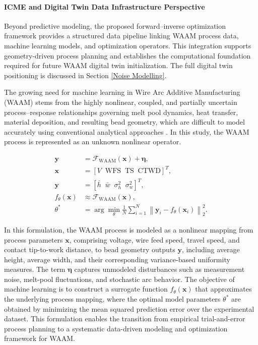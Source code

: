\documentclass[11pt]{article}
\begin{document}
\paragraph{ICME and Digital Twin Data Infrastructure Perspective}

Beyond predictive modeling, the proposed forward–inverse optimization framework provides a 
structured data pipeline linking WAAM process data, machine learning models, and optimization 
operators. This integration supports geometry-driven process planning and establishes the 
computational foundation required for future WAAM digital twin initialization. The full digital 
twin positioning is discussed in Section \ref{Noise Modelling}.

The growing need for machine learning in Wire Arc Additive Manufacturing (WAAM) stems from the highly nonlinear, coupled, and partially uncertain process--response relationships governing melt pool dynamics, heat transfer, material deposition, and resulting bead geometry, which are difficult to model accurately using conventional analytical approaches \cite{Ding2015,Meng2020}. In this study, the WAAM process is represented as an unknown nonlinear operator.

\begin{tcolorbox}[colback=white,colframe=black,boxrule=0.5pt,arc=2pt]
\begin{equation}
\begin{aligned}
\mathbf{y} &= \mathcal{F}_{\mathrm{WAAM}}(\mathbf{x}) + \boldsymbol{\eta}, \\
\mathbf{x} &= [V \;\; \mathrm{WFS} \;\; \mathrm{TS} \;\; \mathrm{CTWD}]^{T}, \\
\mathbf{y} &= [\bar{h} \;\; \bar{w} \;\; \sigma_h^2 \;\; \sigma_w^2]^{T}, \\
f_{\theta}(\mathbf{x}) &\approx \mathcal{F}_{\mathrm{WAAM}}(\mathbf{x}), \\
\theta^{*} &= \arg\min_{\theta} \frac{1}{N} \sum_{i=1}^{N}
\left\| \mathbf{y}_i - f_{\theta}(\mathbf{x}_i) \right\|_2^2.
\end{aligned}
\end{equation}
\end{tcolorbox}

In this formulation, the WAAM process is modeled as a nonlinear mapping from process parameters $\mathbf{x}$, comprising voltage, wire feed speed, travel speed, and contact tip-to-work distance, to bead geometry outputs $\mathbf{y}$, including average height, average width, and their corresponding variance-based uniformity measures. The term $\boldsymbol{\eta}$ captures unmodeled disturbances such as measurement noise, melt-pool fluctuations, and stochastic arc behavior. The objective of machine learning is to construct a surrogate function $f_{\theta}(\mathbf{x})$ that approximates the underlying process mapping, where the optimal model parameters $\theta^{*}$ are obtained by minimizing the mean squared prediction error over the experimental dataset. This formulation enables the transition from empirical trial-and-error process planning to a systematic data-driven modeling and optimization framework for WAAM.
\end{document}

